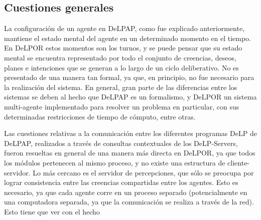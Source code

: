 \subsection{Cuestiones generales}

La configuración de un agente en DeLPAP, como fue explicado anteriormente, mantiene el estado mental
del agente en un determinado momento en el tiempo. En DeLPOR estos momentos son los turnos, y se 
puede pensar que su estado mental se encuentra representado por todo el conjunto de creencias, deseos,
planes e intenciones que se generan a lo largo de un ciclo deliberativo. No es presentado de una 
manera tan formal, ya que, en principio, no fue necesario para la realización del sistema. En general,
gran parte de las diferencias entre los sistemas se deben al hecho que DeLPAP es un formalismo, y 
DeLPOR un sistema multi-agente implementado para resolver un problema en particular, con sus 
determinadas restricciones de tiempo de cómputo, entre otras.

Las cuestiones relativas a la comunicación entre los diferentes programas DeLP de DeLPAP, realizados
a través de consultas contextuales de los DeLP-Servers, fueron resueltas en general de una manera más
directa en DeLPOR, ya que todos los módulos pertenecen al mismo proceso, y no existe una estructura
de cliente-servidor. Lo más cercano es el servidor de percepciones, que sólo se preocupa por lograr
consistencia entre las creencias compartidas entre los agentes. Esto es necesario, ya que cada agente
corre en un proceso separado (potencialmente en una computadora separada, ya que la comunicación se
realiza a través de la red). Esto tiene que ver con el hecho 